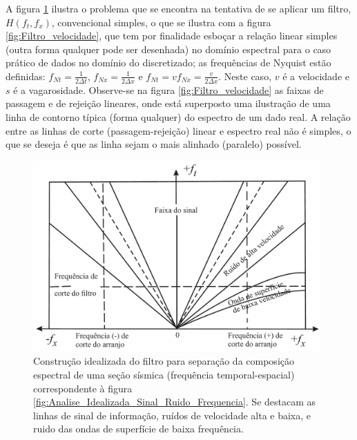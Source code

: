 A figura \ref{fig:Analise_Idealizada_Filtro_Separa} ilustra o problema que se encontra na tentativa de se aplicar um filtro, $H(f_{t},f_{x})$, convencional simples, o que se ilustra com a figura \ref{fig:Filtro_velocidade}, que tem por finalidade esboçar a relação linear simples (outra forma qualquer pode ser desenhada) no domínio espectral para o caso prático de dados no domínio do discretizado; as frequências de Nyquist estão definidas: 
$f_{Nt}=\frac{1}{2 \Delta t}$, $f_{Nx}=\frac{1}{2 \Delta x}$ e $f_{Nt}= vf_{Nx} =\frac{v}{2 \Delta x}$.
Neste caso, $v$ é a velocidade e $s$ é a vagarosidade.
Observe-se na figura \ref{fig:Filtro_velocidade} as faixas de passagem e de rejeição lineares, onde está superposto uma ilustração de uma linha de contorno típica (forma qualquer) do espectro de um dado real. 
A relação entre as linhas de corte (passagem-rejeição) linear e espectro real não é simples, o que se deseja é que as linha sejam o mais alinhado (paralelo) possível.
\begin{figure}[H]
\centering
\includegraphics[width=11cm]{figuras/cap3/Analise_Idealizada_Filtro_Separa.pdf}
\vspace{-0.3cm}
\caption{Construção idealizada do filtro para separação da composição espectral de uma seção sísmica (frequência temporal-espacial) correspondente à figura \ref{fig:Analise_Idealizada_Sinal_Ruido_Frequencia}. 
Se destacam as linhas de sinal de informação, ruídos de velocidade alta e baixa, e ruido das ondas de superfície de baixa frequência.}
\label{fig:Analise_Idealizada_Filtro_Separa}
\end{figure}
